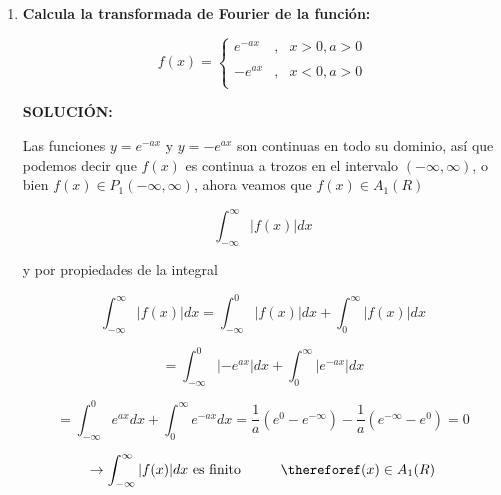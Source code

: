 \documentclass[12pt,a4paper]{article}
\begin{document}
\begin{enumerate}
    
    
        
        
        
        
    
    \item \textbf{Calcula la transformada de Fourier de la función:}
    
    \begin{equation*}
        f(x)= \left\{ \begin{array}{lcc}
             e^{-ax} &   ,  & x>0,a>0\\
             \\ -e^{ax} &  , &  x < 0,a>0 \\
             \end{array}
        \right.
    \end{equation*}
    
    \textbf{SOLUCIÓN:}
    
    Las funciones $y=e^{-ax}$ y $y=-e^{ax}$ son continuas en todo su dominio, así que podemos decir que $f(x)$ es continua a trozos en el intervalo $(-\infty,\infty)$, o bien $f(x) \in P_1(-\infty,\infty)$, ahora veamos que $f(x) \in A_1(R)$
    
    \begin{equation*}
        \int_{-\infty}^{\infty} |f(x)|dx
    \end{equation*}
    
    y por propiedades de la integral
    
    \begin{equation*}
        \int_{-\infty}^{\infty} |f(x)|dx= \int_{-\infty}^{0}|f(x)|dx+ \int_{0}^{\infty}|f(x)|dx
    \end{equation*}
    
    \begin{equation*}
        = \int_{-\infty}^{0}|-e^{ax}|dx+ \int_{0}^{\infty}|e^{-ax}|dx
    \end{equation*}
    
    \begin{equation*}
        = \int_{-\infty}^{0}e^{ax}dx+ \int_{0}^{\infty}e^{-ax}dx = \frac{1}{a}(e^{0}-e^{-\infty})-\frac{1}{a}(e^{-\infty}-e^{0})=0
    \end{equation*}
    
    \begin{equation*}
        \rightarrow \int_{-\infty}^{\infty} |f(x)|dx\text{ es finito} \hspace{1cm} \thereforef(x)\in A_1(R)
    \end{equation*}
    

\end{enumerate}
\end{document}
